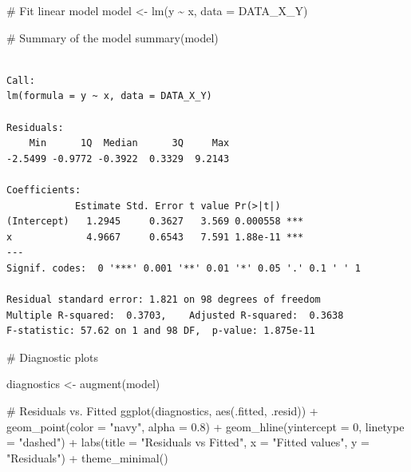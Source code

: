 \documentclass[
  11pt,
]{article}
\newenvironment{Shaded}{\begin{snugshade}}{\end{snugshade}}
\newcommand{\AttributeTok}[1]{\textcolor[rgb]{0.40,0.45,0.13}{#1}}
\newcommand{\CommentTok}[1]{\textcolor[rgb]{0.37,0.37,0.37}{#1}}
\newcommand{\DecValTok}[1]{\textcolor[rgb]{0.68,0.00,0.00}{#1}}
\newcommand{\FloatTok}[1]{\textcolor[rgb]{0.68,0.00,0.00}{#1}}
\newcommand{\FunctionTok}[1]{\textcolor[rgb]{0.28,0.35,0.67}{#1}}
\newcommand{\NormalTok}[1]{\textcolor[rgb]{0.00,0.23,0.31}{#1}}
\newcommand{\OtherTok}[1]{\textcolor[rgb]{0.00,0.23,0.31}{#1}}
\newcommand{\SpecialCharTok}[1]{\textcolor[rgb]{0.37,0.37,0.37}{#1}}
\newcommand{\StringTok}[1]{\textcolor[rgb]{0.13,0.47,0.30}{#1}}
\begin{document}
\begin{Shaded}
\begin{Highlighting}[]
\CommentTok{\# Fit linear model}
\NormalTok{model }\OtherTok{\textless{}{-}} \FunctionTok{lm}\NormalTok{(y }\SpecialCharTok{\textasciitilde{}}\NormalTok{ x, }\AttributeTok{data =}\NormalTok{ DATA\_X\_Y)}

\CommentTok{\# Summary of the model}
\FunctionTok{summary}\NormalTok{(model)}
\end{Highlighting}
\end{Shaded}

\begin{verbatim}

Call:
lm(formula = y ~ x, data = DATA_X_Y)

Residuals:
    Min      1Q  Median      3Q     Max 
-2.5499 -0.9772 -0.3922  0.3329  9.2143 

Coefficients:
            Estimate Std. Error t value Pr(>|t|)    
(Intercept)   1.2945     0.3627   3.569 0.000558 ***
x             4.9667     0.6543   7.591 1.88e-11 ***
---
Signif. codes:  0 '***' 0.001 '**' 0.01 '*' 0.05 '.' 0.1 ' ' 1

Residual standard error: 1.821 on 98 degrees of freedom
Multiple R-squared:  0.3703,    Adjusted R-squared:  0.3638 
F-statistic: 57.62 on 1 and 98 DF,  p-value: 1.875e-11
\end{verbatim}

\begin{Shaded}
\begin{Highlighting}[]
\CommentTok{\# Diagnostic plots}

\NormalTok{diagnostics }\OtherTok{\textless{}{-}} \FunctionTok{augment}\NormalTok{(model)}

\CommentTok{\# Residuals vs. Fitted}
\FunctionTok{ggplot}\NormalTok{(diagnostics, }\FunctionTok{aes}\NormalTok{(.fitted, .resid)) }\SpecialCharTok{+}
  \FunctionTok{geom\_point}\NormalTok{(}\AttributeTok{color =} \StringTok{"navy"}\NormalTok{, }\AttributeTok{alpha =} \FloatTok{0.8}\NormalTok{) }\SpecialCharTok{+}
  \FunctionTok{geom\_hline}\NormalTok{(}\AttributeTok{yintercept =} \DecValTok{0}\NormalTok{, }\AttributeTok{linetype =} \StringTok{"dashed"}\NormalTok{) }\SpecialCharTok{+}
  \FunctionTok{labs}\NormalTok{(}\AttributeTok{title =} \StringTok{"Residuals vs Fitted"}\NormalTok{, }\AttributeTok{x =} \StringTok{"Fitted values"}\NormalTok{, }
       \AttributeTok{y =} \StringTok{"Residuals"}\NormalTok{) }\SpecialCharTok{+}
  \FunctionTok{theme\_minimal}\NormalTok{()}
\end{Highlighting}
\end{Shaded}
\end{document}
